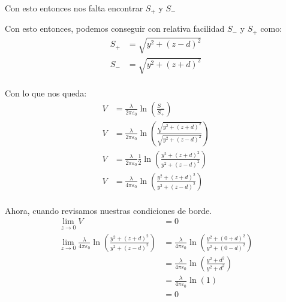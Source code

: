 \documentclass{report}
\begin{document}
Con esto entonces nos falta encontrar $S_+$ y $S_-$



Con esto entonces, podemos conseguir con relativa facilidad $S_-$ y $S_+$ como:
\begin{align*}
	S_+ &= \sqrt{y^2 + \left( z - d \right)^2}\\
	S_- &= \sqrt{y^2 + \left( z + d \right)^2}\\
\end{align*}

Con lo que nos queda:
\begin{align*}
	V &= \frac{\lambda}{2\pi \varepsilon_0 } \ln \left( \frac{S_-}{S_+} \right)\\
	V &= \frac{\lambda}{2\pi \varepsilon_0 } \ln \left( \frac{\sqrt{y^2 + \left( z + d \right)^2}}{\sqrt{y^2 + \left( z - d \right)^2}} \right)\\
	V &= \frac{\lambda}{2\pi \varepsilon_0 } \frac{1}{2}\ln \left( \frac{y^2 + \left( z + d \right)^2}{y^2 + \left( z - d \right)^2} \right)\\
	V &= \frac{\lambda}{4\pi \varepsilon_0 } \ln \left( \frac{y^2 + \left( z + d \right)^2}{y^2 + \left( z - d \right)^2} \right)\\
\end{align*}

Ahora, cuando revisamos nuestras condiciones de borde.
\begin{align*}
	\lim_{z \to 0} V &= 0\\
	\lim_{z \to 0} \frac{\lambda}{4\pi \varepsilon_0 } \ln \left( \frac{y^2 + \left( z + d \right)^2}{y^2 + \left( z - d \right)^2} \right) &= \frac{\lambda}{4\pi \varepsilon_0 } \ln \left( \frac{y^2 + \left( 0 + d \right)^2}{y^2 + \left( 0 - d \right)^2} \right)\\
	&= \frac{\lambda}{4\pi\varepsilon_0 } \ln \left( \frac{y^2 + d^2}{y^2 + d^2} \right)\\
	&= \frac{\lambda}{4\pi\varepsilon_0 } \ln \left( 1 \right)\\
	&= 0
\end{align*}
\end{document}
